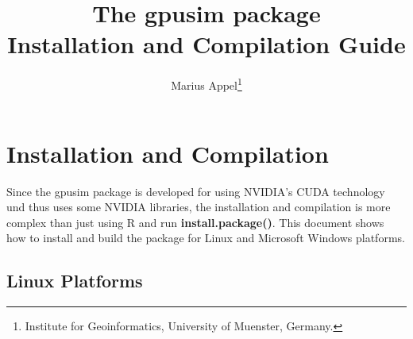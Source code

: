 \documentclass[11pt,oneside,a4paper]{article}
\begin{document}
\title{
The \textbf{gpusim} package\\
Installation and Compilation Guide 
\vspace{1in}}

\author{
Marius Appel\footnote{Institute for Geoinformatics, University of Muenster, Germany.} \\
\vspace*{\fill}}

\maketitle

\newpage




\section{Installation and Compilation}

Since the gpusim package is developed for using NVIDIA's CUDA technology und thus uses some NVIDIA libraries, the installation and compilation is more complex than just using R and run \ttfamily \textbf{install.package()}\normalfont. This document shows how to install and build the package for Linux and Microsoft Windows platforms.

\subsection{Linux Platforms}
\end{document}
